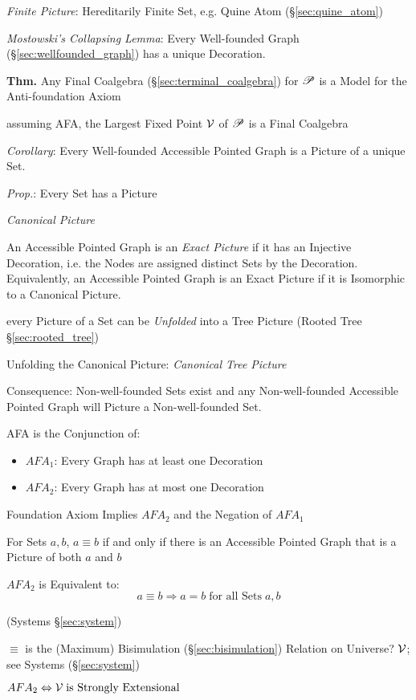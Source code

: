 \emph{Finite Picture}: Hereditarily Finite Set, e.g. Quine Atom
(\S\ref{sec:quine_atom})

\emph{Mostowski's Collapsing Lemma}: Every Well-founded Graph
(\S\ref{sec:wellfounded_graph}) has a unique Decoration.

\textbf{Thm.} Any Final Coalgebra (\S\ref{sec:terminal_coalgebra}) for
$\mathscr{P}$ is a Model for the Anti-foundation Axiom

assuming AFA, the Largest Fixed Point $\mathcal{V}$ of $\mathscr{P}$ is a Final
Coalgebra

\emph{Corollary}: Every Well-founded Accessible Pointed Graph is a
Picture of a unique Set.

\emph{Prop.}: Every Set has a Picture

\emph{Canonical Picture}

An Accessible Pointed Graph is an \emph{Exact Picture} if it has an
Injective Decoration, i.e. the Nodes are assigned distinct Sets by the
Decoration. Equivalently, an Accessible Pointed Graph is an Exact
Picture if it is Isomorphic to a Canonical Picture.

every Picture of a Set can be \emph{Unfolded} into a Tree Picture
(Rooted Tree \S\ref{sec:rooted_tree})

Unfolding the Canonical Picture: \emph{Canonical Tree Picture}

Consequence: Non-well-founded Sets exist and any Non-well-founded
Accessible Pointed Graph will Picture a Non-well-founded Set.

AFA is the Conjunction of:
\begin{itemize}
  \item $AFA_1$: Every Graph has at least one Decoration
  \item $AFA_2$: Every Graph has at most one Decoration
\end{itemize}

Foundation Axiom Implies $AFA_2$ and the Negation of $AFA_1$

For Sets $a,b$, $a \equiv b$ if and only if there is an Accessible
Pointed Graph that is a Picture of both $a$ and $b$

$AFA_2$ is Equivalent to:
\[
  a \equiv b \Rightarrow a = b \;\text{for all Sets}\; a,b
\]

(Systems \S\ref{sec:system})

$\equiv$ is the (Maximum) Bisimulation (\S\ref{sec:bisimulation}) Relation on
Universe? $\mathcal{V}$; see Systems (\S\ref{sec:system})

$AFA_2 \Leftrightarrow \mathcal{V} \;\text{is Strongly Extensional}$

